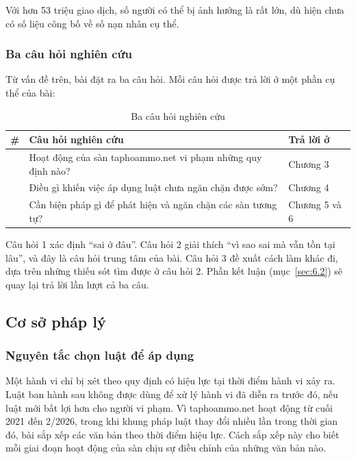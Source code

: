 Với hơn 53 triệu giao dịch, số người có thể bị ảnh hưởng là rất lớn, dù hiện chưa có số liệu công bố về số nạn nhân cụ thể.

\subsubsection{Ba câu hỏi nghiên cứu}\label{sec:2.1.3}

Từ vấn đề trên, bài đặt ra ba câu hỏi. Mỗi câu hỏi được trả lời ở một phần cụ thể của bài:

{\small{}
\begin{table}[H]
\centering
\caption{Ba câu hỏi nghiên cứu}\label{tab:2.3}
\begin{tabularx}{\textwidth}{>{\raggedright\arraybackslash}l>{\hsize=1.000\hsize\raggedright\arraybackslash}X>{\raggedright\arraybackslash}l}
\toprule
\textbf{\#} & \textbf{Câu hỏi nghiên cứu} & \textbf{Trả lời ở} \\
\midrule
1 & Hoạt động của sàn taphoammo.net vi phạm những quy định nào? & Chương 3 \\
2 & Điều gì khiến việc áp dụng luật chưa ngăn chặn được sớm? & Chương 4 \\
3 & Cần biện pháp gì để phát hiện và ngăn chặn các sàn tương tự? & Chương 5 và 6 \\
\bottomrule
\end{tabularx}
\end{table}}

Câu hỏi 1 xác định “sai ở đâu”. Câu hỏi 2 giải thích “vì sao sai mà vẫn tồn tại lâu”, và đây là câu hỏi trung tâm của bài. Câu hỏi 3 đề xuất cách làm khác đi, dựa trên những thiếu sót tìm được ở câu hỏi 2. Phần kết luận (mục~\ref{sec:6.2}) sẽ quay lại trả lời lần lượt cả ba câu.

\subsection{Cơ sở pháp lý}\label{sec:2.2}

\subsubsection{Nguyên tắc chọn luật để áp dụng}\label{sec:2.2.1}

Một hành vi chỉ bị xét theo quy định có hiệu lực tại thời điểm hành vi xảy ra. Luật ban hành sau không được dùng để xử lý hành vi đã diễn ra trước đó, nếu luật mới bất lợi hơn cho người vi phạm. Vì taphoammo.net hoạt động từ cuối 2021 đến 2/2026, trong khi khung pháp luật thay đổi nhiều lần trong thời gian đó, bài sắp xếp các văn bản theo thời điểm hiệu lực. Cách sắp xếp này cho biết mỗi giai đoạn hoạt động của sàn chịu sự điều chỉnh của những văn bản nào.

